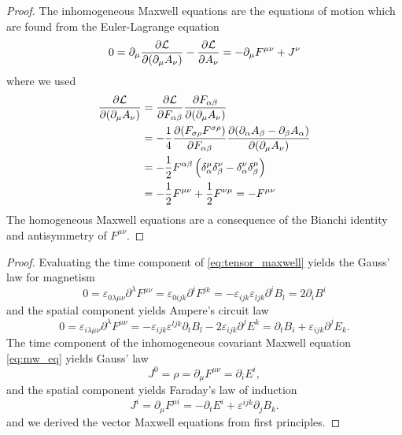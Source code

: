 \mweqtensor
\begin{proof}
	The inhomogeneous Maxwell equations are the equations of motion which are found from the Euler-Lagrange equation
	\begin{equation*}
		0
		=
		\partial_\mu
		\pdv{\mathcal{L}}{(\partial_\mu A_\nu)}
		-
		\pdv{\mathcal{L}}{A_\nu}
		=
		-
		\partial_\mu
		F^{\mu\nu}
		+
		J^\nu
	\end{equation*}
	where we used
	\begin{equation*}
		\begin{split}
			\pdv{\mathcal{L}}{(\partial_\mu A_\nu)}
			&=
			\pdv{\mathcal{L}}{F_{\alpha\beta}}
			\pdv{F_{\alpha\beta}}{(\partial_\mu A_\nu)}
			\\
			&=
			-
			\frac{1}{4}
			\pdv{(F_{\sigma\rho}F^{\sigma\rho})}{F_{\alpha\beta}}
			\pdv{(\partial_\alpha A_\beta-\partial_\beta A_\alpha)}{(\partial_\mu A_\nu)}
			\\
			&=
			-
			\frac{1}{2}
			F^{\alpha\beta}
			\left(
				\delta_\alpha^\mu
				\delta_\beta^\nu
				-
				\delta_\alpha^\nu
				\delta_\beta^\mu
			\right)
			\\
			&=
			-
			\frac{1}{2}
			F^{\mu\nu}
			+
			\frac{1}{2}
			F^{\nu\mu}
			=
			-
			F^{\mu\nu}			
		\end{split}
	\end{equation*}
	The homogeneous Maxwell equations are a consequence of the Bianchi identity and antisymmetry of $F^{\mu\nu}$.
\end{proof}
\mweqvector
\begin{proof}
	Evaluating the time component of \cref{eq:tensor_maxwell} yields the Gauss' law for magnetism
	\begin{equation*}
		0
		=
		\varepsilon_{0\lambda\mu\nu}\partial^\lambda F^{\mu\nu}
		=
		\varepsilon_{0ijk}\partial^iF^{jk}
		=
		-
		\varepsilon_{ijk}\varepsilon_{ljk}
		\partial^i B_l
		=
		2\partial_iB^i
	\end{equation*}
	and the spatial component yields Ampere's circuit law
	\begin{equation*}
		0
		=
		\varepsilon_{i\lambda\mu\nu}
		\partial^\lambda
		F^{\mu\nu}
		=
		-
		\varepsilon_{ijk}
		\varepsilon^{ljk}
		\partial_t B_l
		-
		2\varepsilon_{ijk}
		\partial^jE^k
		=
		\partial_tB_i
		+
		\varepsilon_{ijk}
		\partial^jE_k
		.
	\end{equation*}
	The time component of the inhomogeneous covariant Maxwell equation \cref{eq:mw_eq} yields Gauss' law
	\begin{equation*}
		J^0
		=
		\rho
		=
		\partial_\mu F^{\mu\nu}
		=
		\partial_i E^i
		,
	\end{equation*}
	and the spatial component yields Faraday's law of induction
	\begin{equation*}
		J^i
		=
		\partial_\mu F^{\mu i}
		=
		-
		\partial_t E^i
		+
		\varepsilon^{ijk}
		\partial_j
		B_k
		.
	\end{equation*}
	and we derived the vector Maxwell equations from first principles.
\end{proof}

